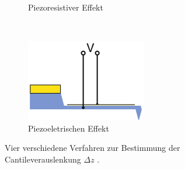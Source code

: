 \begin{figure}[H]
\begin{subfigure}[t]{0.22\textwidth}
  \caption{Piezoresistiver Effekt}
  \label{fig:typ3}
  \end{subfigure}
  ~
  \begin{subfigure}[t]{0.22\textwidth}
  \includegraphics[width=\textwidth]{Abb/typ4.png}
  \caption{Piezoeletrischen Effekt}
  \label{fig:typ4}
  \end{subfigure}
	\caption{Vier verschiedene Verfahren zur Bestimmung der Cantileverauslenkung
  $\Delta z$ \cite{AFM}.}
\label{fig:typen}
\end{figure}

